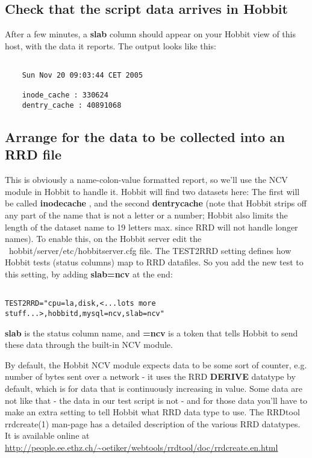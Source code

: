 \subsection{Check that the script data arrives in Hobbit}


 After a few minutes, a \textbf{slab}
 column should appear on your Hobbit view of this host, with the data it reports. The output looks like this: \begin{verbatim}

	Sun Nov 20 09:03:44 CET 2005

	inode_cache : 330624
	dentry_cache : 40891068

\end{verbatim}

\subsection{Arrange for the data to be collected into an RRD file}


 This is obviously a name-colon-value formatted report, so we'll use the NCV module in Hobbit to handle it. Hobbit will find two datasets here: The first will be called \textbf{inodecache}
, and the second \textbf{dentrycache}
 (note that Hobbit strips off any part of the name that is not a letter or a number; Hobbit also limits the length of the dataset name to 19 letters max. since RRD will not handle longer names). To enable this, on the Hobbit server edit the ~hobbit/server/etc/hobbitserver.cfg file. The TEST2RRD setting defines how Hobbit tests (status columns) map to RRD datafiles. So you add the new test to this setting, by adding \textbf{slab=ncv}
 at the end: \begin{verbatim}

TEST2RRD="cpu=la,disk,<...lots more stuff...>,hobbitd,mysql=ncv,slab=ncv"

\end{verbatim}



 \textbf{slab}
 is the status column name, and \textbf{=ncv}
 is a token that tells Hobbit to send these data through the built-in NCV module.


 By default, the Hobbit NCV module expects data to be some sort of counter, e.g. number of bytes sent over a network - it uses the RRD \textbf{DERIVE}
 datatype by default, which is for data that is continuously increasing in value. Some data are not like that - the data in our test script is not - and for those data you'll have to make an extra setting to tell Hobbit what RRD data type to use. The RRDtool rrdcreate(1) man-page has a detailed description of the various RRD datatypes. It is available online at  \url{http://people.ee.ethz.ch/~oetiker/webtools/rrdtool/doc/rrdcreate.en.html}



